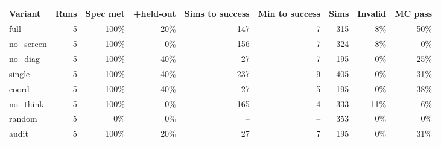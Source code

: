 \begin{tabular}{lrrrrrrrr}
\toprule
Variant & Runs & Spec met & +held-out & Sims to success & Min to success & Sims & Invalid & MC pass \\
\midrule
full & 5 & 100\% & 20\% & 147 & 7 & 315 & 8\% & 50\% \\
no\_screen & 5 & 100\% & 0\% & 156 & 7 & 324 & 8\% & 0\% \\
no\_diag & 5 & 100\% & 40\% & 27 & 7 & 195 & 0\% & 25\% \\
single & 5 & 100\% & 40\% & 237 & 9 & 405 & 0\% & 31\% \\
coord & 5 & 100\% & 40\% & 27 & 5 & 195 & 0\% & 38\% \\
no\_think & 5 & 100\% & 0\% & 165 & 4 & 333 & 11\% & 6\% \\
random & 5 & 0\% & 0\% & -- & -- & 353 & 0\% & 0\% \\
audit & 5 & 100\% & 20\% & 27 & 7 & 195 & 0\% & 31\% \\
\bottomrule
\end{tabular}
